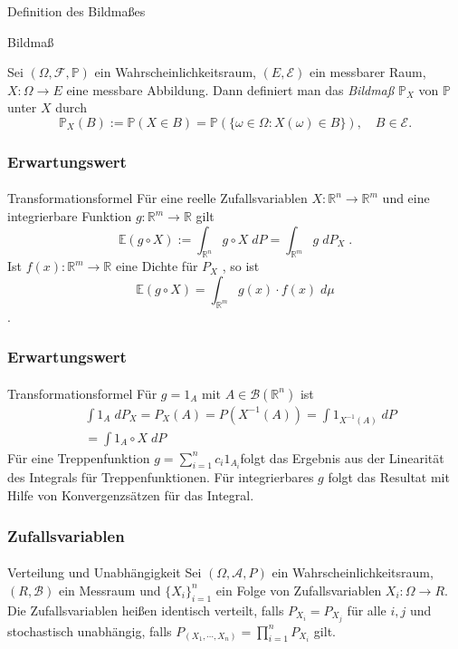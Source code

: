 \documentclass{beamer}
\begin{document}
\begin{frame}{Definition des Bildmaßes}
    \begin{block}{Bildmaß}

    Sei
 $(\Omega,\mathcal{F},\mathbb{P})$ ein Wahrscheinlichkeitsraum,
    $(E,\mathcal{E})$ ein messbarer Raum,
    $X:\Omega\to E$ eine messbare Abbildung.  
  Dann definiert man das \emph{Bildmaß}  $\mathbb{P}_X$ von $\mathbb{P}$ unter $X$ durch
  \[
    \mathbb{P}_X(B) 
    := \mathbb{P}(X \in B) 
    = \mathbb{P}(\{\omega \in \Omega : X(\omega) \in B\}),
    \quad B \in \mathcal{E}.
  \]
\end{block}
\end{frame}



\begin{frame}
    \frametitle{Erwartungswert}
\framesubtitle{}
\begin{block}{Transformationsformel}
Für eine reelle Zufallsvariablen $X: \mathbb{R}^n \to \mathbb{R}^m$ und eine integrierbare Funktion $g:  \mathbb{R}^m \to \mathbb{R}$ gilt
$$ \mathbb{E} (g \circ X) := \int_{\mathbb{R}^n} g \circ X \; dP = \int_{\mathbb{R}^m}  g \; dP_X \;. $$Ist $f(x) : \mathbb{R}^m \to \mathbb{R}$ eine Dichte für $P_X$ , so ist  
$$\mathbb{E} (g \circ X) =  \int_{\mathbb{R}^m} g(x) \cdot f(x) \; d\mu$$.
\end{block}
 \end{frame}

 \begin{frame}
    \frametitle{Erwartungswert}
\framesubtitle{}
\begin{block}{Transformationsformel}
Für $g = 1_A$ mit $A \in \mathcal{B}(\mathbb{R}^n)$ ist
\begin{align*}
& \int 1_A \; dP_X = P_X(A) = P(X^{-1} (A)) = \int 1_{X^{-1}(A)} \; dP \\
&= \int 1_{A} \circ X \; dP
\end{align*}
Für eine Treppenfunktion $g= \sum_{i= 1}^n c_i 1_{A_i} $folgt das Ergebnis aus der Linearität des Integrals  für Treppenfunktionen. Für integrierbares $g$ folgt das Resultat mit Hilfe von Konvergenzsätzen für das  Integral.
\end{block}
 \end{frame}



\begin{frame}
    \frametitle{Zufallsvariablen}
\framesubtitle{}
\begin{block}{Verteilung und Unabhängigkeit}
Sei $(\Omega, \mathcal{A}, P)$ ein Wahrscheinlichkeitsraum, $(R, \mathcal{B})$ ein Messraum  und
 $\{X_i\}_{i=1}^n$ ein Folge von Zufallsvariablen   $X_i :  \Omega \to R$.
Die Zufallsvariablen heißen identisch verteilt, falls
 $P_{X_i} = P_{X_j}$ für alle $i,j$  und
stochastisch unabhängig, falls
 $P_{(X_1, \cdots ,X_n)} = \prod_{i=1}^n P_{X_i}$ gilt. 
\end{block}
 \end{frame}
\end{document}
